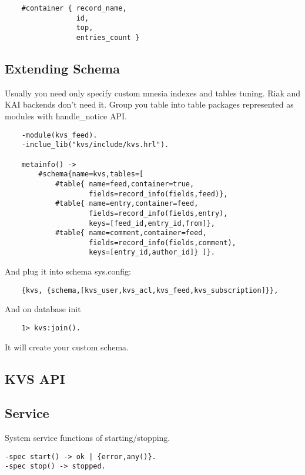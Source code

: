 \begin{lstlisting}
    #container { record_name,
                 id,
                 top,
                 entries_count }
\end{lstlisting}

\subsection{Extending Schema}

Usually you need only specify custom mnesia indexes and tables tuning.
Riak and KAI backends don't need it. Group you table into table packages
represented as modules with handle\_notice API.

\begin{lstlisting}
    -module(kvs_feed).
    -inclue_lib("kvs/include/kvs.hrl").

    metainfo() -> 
        #schema{name=kvs,tables=[
            #table{ name=feed,container=true,
                    fields=record_info(fields,feed)},
            #table{ name=entry,container=feed,
                    fields=record_info(fields,entry),
                    keys=[feed_id,entry_id,from]},
            #table{ name=comment,container=feed,
                    fields=record_info(fields,comment),
                    keys=[entry_id,author_id]} ]}.
\end{lstlisting}

And plug it into schema sys.config:

\begin{lstlisting}
    {kvs, {schema,[kvs_user,kvs_acl,kvs_feed,kvs_subscription]}},
\end{lstlisting}

And on database init

\begin{lstlisting}
    1> kvs:join().
\end{lstlisting}

It will create your custom schema.

\subsection{KVS API}

\subsection{Service}
System service functions of starting/stopping.

\vspace{1\baselineskip}
\begin{lstlisting}
-spec start() -> ok | {error,any()}.
-spec stop() -> stopped.
\end{lstlisting}
\vspace{1\baselineskip}

